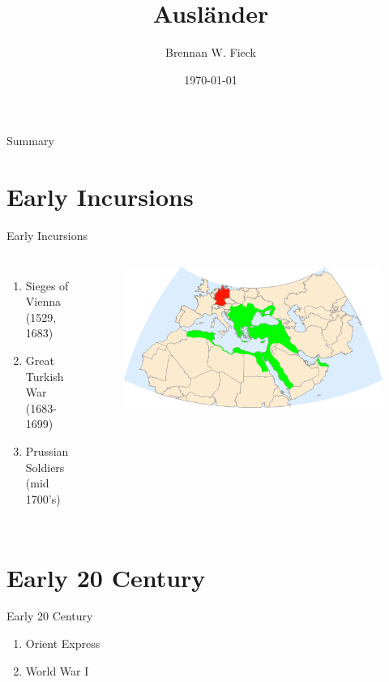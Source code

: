 \documentclass{beamer}
\title[Turks in Germany]{Ausl{\"a}nder}
\date{\today}
\author{Brennan W. Fieck}
\institute{LAIS 418 - Narrating the Notion}
\begin{document}
\frame{\titlepage}
\section{}
\begin{frame}{Summary}
	\tableofcontents
\end{frame}

\section{Early Incursions}
\begin{frame}{Early Incursions}
	\begin{columns}
			\begin{enumerate}
				\item Sieges of Vienna (1529, 1683)
				\item Great Turkish War (1683-1699)
				\item Prussian Soldiers (mid 1700's)
			\end{enumerate}
			\vcenter
			\begin{figure}[ht]
				\centering
				\includegraphics[width=1.4\textwidth]{1683OttomanEmpire.png}
			\end{figure}
			
	\end{columns}
\end{frame}

\section{Early 20 Century}
\begin{frame}{Early 20 Century}
	\begin{enumerate}
		\item Orient Express
		\item World War I
	\end{enumerate}
\end{frame}
\end{document}
